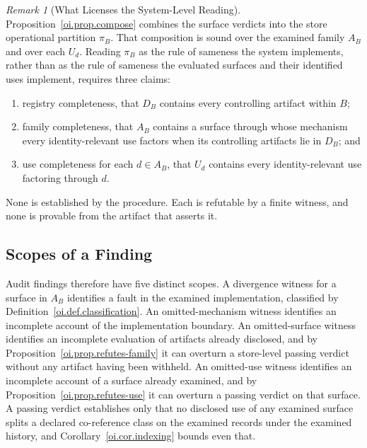 \documentclass[11pt]{article}
\theoremstyle{plain}
\theoremstyle{definition}
\theoremstyle{remark}
\newtheorem{remark}[theorem]{Remark}
\begin{document}
\begin{remark}[What Licenses the System-Level Reading]
  \label{oi.rem.systemreading}
  Proposition~\ref{oi.prop.compose} combines the surface verdicts
  into the store operational partition \(\pi_B\).
  That composition is sound over the examined family \(A_B\)
  and over each \(U_d\).
  Reading \(\pi_B\) as the rule of sameness the system implements,
  rather than as the rule of sameness
  the evaluated surfaces and their identified uses implement,
  requires three claims:
  \begin{enumerate}[label=(\arabic*)]
    \item registry completeness,
          that \(D_B\) contains every controlling artifact within \(B\);
    \item family completeness,
          that \(A_B\) contains a surface through whose mechanism
          every identity-relevant use factors
          when its controlling artifacts lie in \(D_B\); and
    \item use completeness for each \(d\in A_B\),
          that \(U_d\) contains every identity-relevant use factoring through \(d\).
  \end{enumerate}
  None is established by the procedure.
  Each is refutable by a finite witness,
  and none is provable from the artifact that asserts it.
\end{remark}

\subsection{Scopes of a Finding}

Audit findings therefore have five distinct scopes.
A divergence witness for a surface in \(A_B\)
identifies a fault in the examined implementation,
classified by Definition~\ref{oi.def.classification}.
An omitted-mechanism witness
identifies an incomplete account of the implementation boundary.
An omitted-surface witness
identifies an incomplete evaluation of artifacts already disclosed,
and by Proposition~\ref{oi.prop.refutes-family}
it can overturn a store-level passing verdict
without any artifact having been withheld.
An omitted-use witness
identifies an incomplete account of a surface already examined,
and by Proposition~\ref{oi.prop.refutes-use}
it can overturn a passing verdict on that surface.
A passing verdict establishes only that
no disclosed use of any examined surface
splits a declared co-reference class
on the examined records under the examined history,
and Corollary~\ref{oi.cor.indexing} bounds even that.
\end{document}
